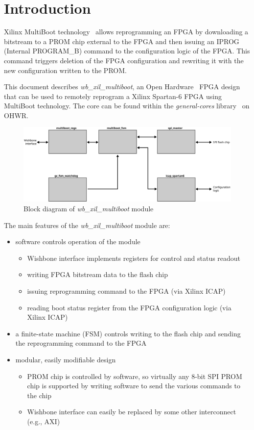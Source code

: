 \documentclass[a4paper,11pt]{article}
\begin{document}
\section{Introduction}
\label{sec:intro}

Xilinx MultiBoot technology~\cite{ug380} allows reprogramming an FPGA by downloading a
bitstream to a PROM chip external to the FPGA and then issuing an IPROG (Internal
PROGRAM\_B) command to the configuration logic of the FPGA. This command triggers
deletion of the FPGA configuration and rewriting it with the new configuration
written to the PROM.

This document describes \textit{wb\_xil\_multiboot}, an Open Hardware~\cite{ohwr}
FPGA design that can be used to remotely reprogram a Xilinx Spartan-6 FPGA using
MultiBoot technology. The core can be found within the \textit{general-cores}
library~\cite{gencores-ohwr} on OHWR.

\begin{figure}[h]
  \centerline{\includegraphics[width=\textwidth]{fig/multiboot-bd}}
  \label{fig:multiboot-bd}
  \caption{Block diagram of \textit{wb\_xil\_multiboot} module}
\end{figure}

The main features of the \textit{wb\_xil\_multiboot} module are:
\begin{itemize}
  \item software controls operation of the module
  \begin{itemize}
    \item Wishbone interface implements registers for control and status readout
    \item writing FPGA bitstream data to the flash chip
    \item issuing reprogramming command to the FPGA (via Xilinx ICAP)
    \item reading boot status register from the FPGA configuration logic (via Xilinx ICAP)
  \end{itemize}
  \item a finite-state machine (FSM) controls writing to the flash chip and sending the
  reprogramming command to the FPGA
  \item modular, easily modifiable design
  \begin{itemize}
    \item PROM chip is controlled by software, so virtually any 8-bit SPI PROM chip is
    supported by writing software to send the various commands to the chip
    \item Wishbone interface can easily be replaced by some other interconnect (e.g., AXI)
  \end{itemize}
\end{itemize}
\end{document}
